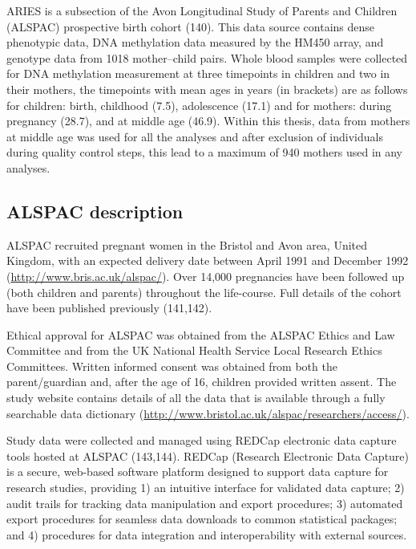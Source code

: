 \documentclass[11pt,twoside]{bristolthesis}
\begin{document}
ARIES is a subsection of the Avon Longitudinal Study of Parents and Children (ALSPAC) prospective birth cohort (140). This data source contains dense phenotypic data, DNA methylation data measured by the HM450 array, and genotype data from 1018 mother--child pairs. Whole blood samples were collected for DNA methylation measurement at three timepoints in children and two in their mothers, the timepoints with mean ages in years (in brackets) are as follows for children: birth, childhood (7.5), adolescence (17.1) and for mothers: during pregnancy (28.7), and at middle age (46.9). Within this thesis, data from mothers at middle age was used for all the analyses and after exclusion of individuals during quality control steps, this lead to a maximum of 940 mothers used in any analyses.

\hypertarget{alspac-description-02}{%
\subsection{ALSPAC description}\label{alspac-description-02}}

ALSPAC recruited pregnant women in the Bristol and Avon area, United Kingdom, with an expected delivery date between April 1991 and December 1992 (\url{http://www.bris.ac.uk/alspac/}). Over 14,000 pregnancies have been followed up (both children and parents) throughout the life-course. Full details of the cohort have been published previously (141,142).

Ethical approval for ALSPAC was obtained from the ALSPAC Ethics and Law Committee and from the UK National Health Service Local Research Ethics Committees. Written informed consent was obtained from both the parent/guardian and, after the age of 16, children provided written assent. The study website contains details of all the data that is available through a fully searchable data dictionary (\url{http://www.bristol.ac.uk/alspac/researchers/access/}).

Study data were collected and managed using REDCap electronic data capture tools hosted at ALSPAC (143,144). REDCap (Research Electronic Data Capture) is a secure, web-based software platform designed to support data capture for research studies, providing 1) an intuitive interface for validated data capture; 2) audit trails for tracking data manipulation and export procedures; 3) automated export procedures for seamless data downloads to common statistical packages; and 4) procedures for data integration and interoperability with external sources.
\end{document}
